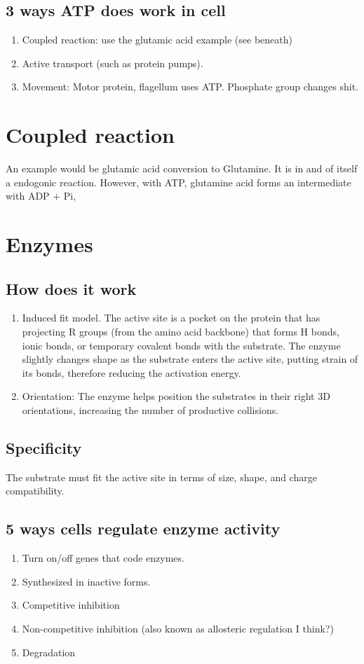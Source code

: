 \documentclass[12pt]{article}
\begin{document}
\subsection{3 ways ATP does work in cell}
\begin{enumerate}
    \item Coupled reaction: use the glutamic acid example (see beneath)
    \item Active transport (such as protein pumps). 
    \item Movement: Motor protein, flagellum uses ATP. Phosphate group changes shit. 
\end{enumerate}

\section{Coupled reaction}
An example would be glutamic acid conversion to Glutamine. It is in and
of itself a endogonic reaction. However, with ATP, glutamine acid
forms an intermediate with ADP + Pi,  

\section{Enzymes}
\subsection{How does it work}
\begin{enumerate}
    \item Induced fit model. 
    The active site is a pocket on the protein that has projecting 
    R groups (from the amino acid backbone) that forms H bonds, 
    ionic bonds, or temporary covalent bonds with the substrate. 
    The enzyme slightly changes shape as the substrate
    enters the active site, putting strain of its bonds, therefore
    reducing the activation energy.
    \item Orientation: The enzyme helps position the substrates in 
    their right 3D orientations, increasing the number of 
    productive collisions. 
\end{enumerate}

\subsection{Specificity}
The substrate must fit the active site in terms of size, shape, and 
charge compatibility. 

\subsection{5 ways cells regulate enzyme activity}
\begin{enumerate}
    \item Turn on/off genes that code enzymes.
    \item Synthesized in inactive forms.
    \item Competitive inhibition
    \item Non-competitive inhibition (also known as allosteric regulation I think?)
    \item Degradation
\end{enumerate}
\end{document}
